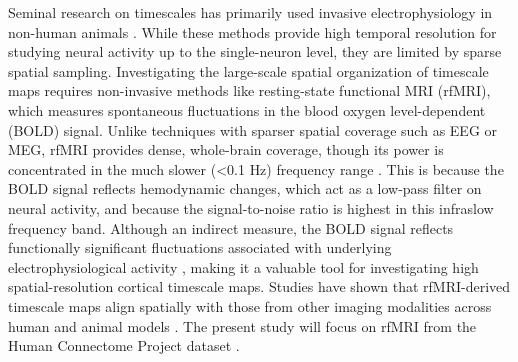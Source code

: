 \documentclass[docs/main.tex]{subfiles}
\begin{document}
Seminal research on timescales has primarily used invasive electrophysiology in non-human animals \citep{murray_hierarchy_2014, cirillo_neural_2018, nougaret_intrinsic_2021, manea_intrinsic_2022, spitmaan_multiple_2020, trepka_training-dependent_2024}. While these methods provide high temporal resolution for studying neural activity up to the single-neuron level, they are limited by sparse spatial sampling. Investigating the large-scale spatial organization of timescale maps requires non-invasive methods like resting-state functional MRI (rfMRI), which measures spontaneous fluctuations in the blood oxygen level-dependent (BOLD) signal. Unlike techniques with sparser spatial coverage such as EEG or MEG, rfMRI provides dense, whole-brain coverage, though its power is concentrated in the much slower (<0.1 Hz) frequency range \citep{raut_hierarchical_2020, he_scale-free_2011}. This is because the BOLD signal reflects hemodynamic changes, which act as a low-pass filter on neural activity, and because the signal-to-noise ratio is highest in this infraslow frequency band. Although an indirect measure, the BOLD signal reflects functionally significant fluctuations associated with underlying electrophysiological activity \citep{logothetis_what_2008}, making it a valuable tool for investigating high spatial-resolution cortical timescale maps. Studies have shown that rfMRI-derived timescale maps align spatially with those from other imaging modalities across human and animal models \citep{raut_hierarchical_2020, shafiei_topographic_2020, lurie_cortical_2024}. The present study will focus on rfMRI from the Human Connectome Project dataset \citep{van_essen_wu-minn_2013}.
\end{document}
